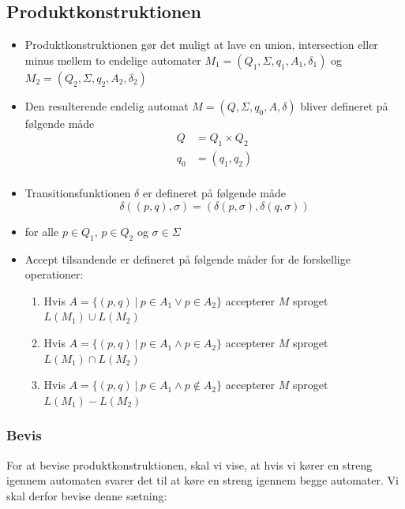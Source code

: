 \documentclass[a4, danish]{article}
\begin{document}
\subsection{Produktkonstruktionen}
\begin{itemize}
  \item Produktkonstruktionen gør det muligt at lave en union, intersection eller minus mellem to endelige automater $M_1=(Q_1,\Sigma,q_1,A_1,\delta_1)$ og $M_2=(Q_2,\Sigma,q_2,A_2,\delta_2)$
  \item Den resulterende endelig automat $M=(Q,\Sigma,q_0,A,\delta)$ bliver defineret på følgende måde
  \begin{align*}
    Q &= Q_1\times Q_2 \\
    q_0 &= (q_1,q_2) \\
  \end{align*}
  \item Transitionsfunktionen $\delta$ er defineret på følgende måde
  \begin{equation*}
    \delta((p,q),\sigma)=(\delta(p,\sigma),\delta(q,\sigma))
  \end{equation*}
  \item for alle $p \in Q_1$, $p \in Q_2$ og $\sigma \in \Sigma$
  \item Accept tilsandende er defineret på følgende måder for de forskellige operationer:
  \begin{enumerate}
    \item Hvis $A=\{(p,q) \ | \ p \in A_1 \lor p \in A_2  \}$ accepterer $M$ sproget $L(M_1) \cup L(M_2)$
    \item Hvis $A=\{(p,q) \ | \ p \in A_1 \land p \in A_2  \}$ accepterer $M$ sproget $L(M_1) \cap L(M_2)$
    \item Hvis $A=\{(p,q) \ | \ p \in A_1 \land p \notin A_2  \}$ accepterer $M$ sproget $L(M_1) - L(M_2)$    
  \end{enumerate}
\end{itemize}

\subsubsection{Bevis}
For at bevise produktkonstruktionen, skal vi vise, at hvis vi kører en streng igennem automaten svarer det til at køre en streng igennem begge automater. Vi skal derfor bevise denne sætning:
\end{document}
